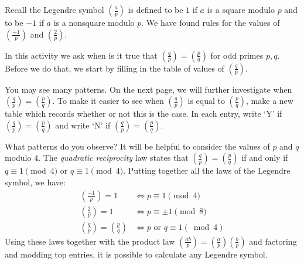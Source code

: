 \documentclass[12pt]{exam}
\begin{document}
\begin{questions}
  \question Recall the Legendre symbol $(\frac ap)$ is defined to be $1$ if $a$ is a square modulo $p$ and to be $-1$ if $a$ is a nonsquare modulo $p$. We have found rules for the values of $(\frac{-1}{p})$ and $(\frac{2}{p})$.
  
  In this activity we ask when is it true that $(\frac qp)=(\frac pq)$ for odd primes $p,q$. Before we do that, we start by filling in the table of values of $(\frac qp)$.
  \begin{center}
  \end{center}
  You may see many patterns. On the next page, we will further investigate when $(\frac qp)=(\frac pq)$.
  \newpage
  \question To make it easier to see when $(\frac qp)$ is equal to $(\frac pq)$, make a new table which records whether or not this is the case. In each entry, write `Y' if $(\frac qp)=(\frac pq)$ and write `N' if $(\frac qp)=(\frac pq)$.
  \begin{center}
  \end{center}
  What patterns do you observe? It will be helpful to consider the values of $p$ and $q$ modulo $4$.
  \newpage
  \question The \emph{quadratic reciprocity} law states that $(\frac qp)=(\frac pq)$ if and only if $q\equiv1\pmod{4}$ or $q\equiv1\pmod{4}$. Putting together all the laws of the Legendre symbol, we have:
  \begin{align*}
    \left(\frac{-1}p\right)=1\quad&\iff p\equiv1\pmod{4}\\
    \left(\frac2p\right)=1\quad&\iff p\equiv\pm1\pmod{8}\\
    \left(\frac qp\right)=\left(\frac pq\right)&\iff p\text{ or }q\equiv1(\bmod4)
  \end{align*}
  Using these laws together with the product law $(\frac{ab}{p})=(\frac ap)(\frac bp)$ and factoring and modding top entries, it is possible to calculate any Legendre symbol.
  

\end{questions}
\end{document}

